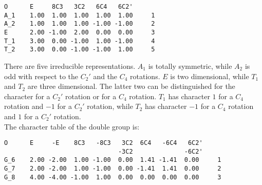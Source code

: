 \documentclass[12pt,a4paper,twoside]{report}
\begin{document}
\begin{tcolorbox}
\begin{footnotesize}
\begin{verbatim}
O      E     8C3   3C2   6C4   6C2' 
A_1    1.00  1.00  1.00  1.00  1.00     1
A_2    1.00  1.00  1.00 -1.00 -1.00     2
E      2.00 -1.00  2.00  0.00  0.00     3
T_1    3.00  0.00 -1.00  1.00 -1.00     4
T_2    3.00  0.00 -1.00 -1.00  1.00     5
\end{verbatim}
\end{footnotesize}
\end{tcolorbox}

There are five irreducible representations. $A_1$ is totally symmetric,
while $A_2$ is odd with respect to the $C_2'$ and the $C_4$ rotations.
$E$ is two dimensional, while $T_1$ and $T_2$ are three dimensional. The
latter two can be distinguished for the character for a $C_2'$ rotation
or for a $C_4$ rotation. $T_1$ has character $1$ for a $C_4$ rotation and
$-1$ for a $C_2'$ rotation, while $T_2$ has character $-1$ for a $C_4$ rotation
and $1$ for a $C_2'$ rotation. \\
The character table of the double group is:

\begin{tcolorbox}
\begin{footnotesize}
\begin{verbatim}
O      E     -E    8C3   -8C3   3C2  6C4   -6C4   6C2'
                               -3C2              -6C2'
G_6    2.00 -2.00  1.00 -1.00  0.00  1.41 -1.41  0.00     1
G_7    2.00 -2.00  1.00 -1.00  0.00 -1.41  1.41  0.00     2
G_8    4.00 -4.00 -1.00  1.00  0.00  0.00  0.00  0.00     3
\end{verbatim}
\end{footnotesize}
\end{tcolorbox}
\end{document}
